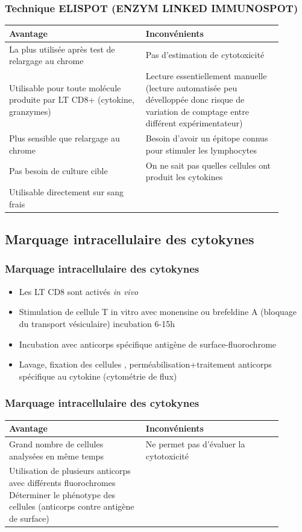 \documentclass[12pt]{beamer}
\begin{document}
\begin{frame}
	\frametitle{Technique ELISPOT (ENZYM LINKED IMMUNOSPOT)}
	{\footnotesize
	\begin{tabular}{|p{0.45\linewidth}|p{0.45\linewidth}|}
		\hline
	Avantage & Inconvénients\\ 
	\hline
	\hline
	La plus utilisée après test de relargage au chrome & Pas d’estimation de cytotoxicité \\ 
	Utilisable pour toute molécule produite par LT CD8+ (cytokine, granzymes) &  Lecture essentiellement manuelle (lecture automatisée peu dévelloppée donc risque de variation de comptage entre différent expérimentateur)\\ 
	Plus sensible que relargage au chrome & Besoin d'avoir un épitope connus pour stimuler les lymphocytes \\ 
	Pas besoin de culture cible & On ne sait pas quelles cellules ont produit les cytokines \\ 
	Utilisable directement sur sang frais &  \\ 
	\hline
	\end{tabular} 
	}
\end{frame}

\subsection{Marquage intracellulaire des cytokynes}

\begin{frame}
  \transuncover
  \frametitle{Marquage intracellulaire des cytokynes}
  
  \begin{itemize}
  	\item Les LT CD8 sont activés \textit{in vivo}
  	\item Stimulation de cellule T in vitro avec monensine ou brefeldine A (bloquage du transport vésiculaire) incubation 6-15h
  	\item Incubation avec anticorps spécifique antigène de surface-fluorochrome
  	\item Lavage, fixation des cellules , perméabilisation+traitement anticorps spécifique au cytokine (cytométrie de flux)
  \end{itemize}

\end{frame}

\begin{frame}
	\frametitle{Marquage intracellulaire des cytokynes}
	{\footnotesize
		\begin{tabular}{|p{0.45\linewidth}|p{0.45\linewidth}|}
			\hline
			Avantage & Inconvénients\\ 
			\hline
			\hline
			Grand nombre de cellules analysées en même temps & Ne permet pas d’évaluer la cytotoxicité \\ 
			Utilisation de plusieurs anticorps avec différents fluorochromes Déterminer le phénotype des cellules (anticorps contre antigène de surface) &  \\
			\hline
		\end{tabular} 
	}
\end{frame}
\end{document}
